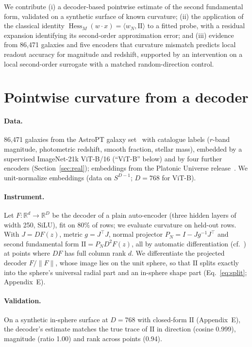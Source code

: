 \documentclass{article}
\newcommand{\norm}[1]{\lVert #1 \rVert}
\begin{document}
We contribute (i) a decoder-based pointwise estimate of the second fundamental form, validated on a synthetic surface of known curvature; (ii) the application of the classical identity $\operatorname{Hess}_M(w\cdot x)=\langle w_N,\mathrm{II}\rangle$ to a fitted probe, with a residual expansion identifying its second-order approximation error; and (iii) evidence from 86{,}471 galaxies and five encoders that curvature mismatch predicts local readout accuracy for magnitude and redshift, supported by an intervention on a local second-order surrogate with a matched random-direction control.


\section{Pointwise curvature from a decoder}
\label{sec:instr}

\paragraph{Data.} 86{,}471 galaxies from the AstroPT galaxy set~\citep{smith2024astropt} with catalogue labels ($r$-band magnitude, photometric redshift, smooth fraction, stellar mass), embedded by a supervised ImageNet-21k ViT-B/16 (``ViT-B'' below) and by four further encoders (Section~\ref{sec:real}); embeddings from the Platonic Universe release~\citep{duraphe2025platonic}. We unit-normalize embeddings (data on $S^{D-1}$; $D=768$ for ViT-B).

\paragraph{Instrument.} Let $F:\mathbb{R}^d\to\mathbb{R}^{D}$ be the decoder of a plain auto-encoder (three hidden layers of width 250, SiLU), fit on 80\% of rows; we evaluate curvature on held-out rows. With $J = DF(z)$, metric $g = J^{\top}J$, normal projector $P_N = I - Jg^{-1}J^{\top}$ and second fundamental form $\mathrm{II} = P_N D^2F(z)$, all by automatic differentiation (cf.~\citep{lee2023curvature,acosta2023extrinsic}) at points where $DF$ has full column rank $d$. We differentiate the projected decoder $F/\norm{F}$, whose image lies on the unit sphere, so that $\mathrm{II}$ splits exactly into the sphere's universal radial part and an in-sphere shape part (Eq.~\eqref{eq:split}; Appendix~E).

\paragraph{Validation.} On a synthetic in-sphere surface at $D=768$ with closed-form $\mathrm{II}$ (Appendix~E), the decoder's estimate matches the true trace of $\mathrm{II}$ in direction (cosine 0.999), magnitude (ratio 1.00) and rank across points (0.94).
\end{document}
